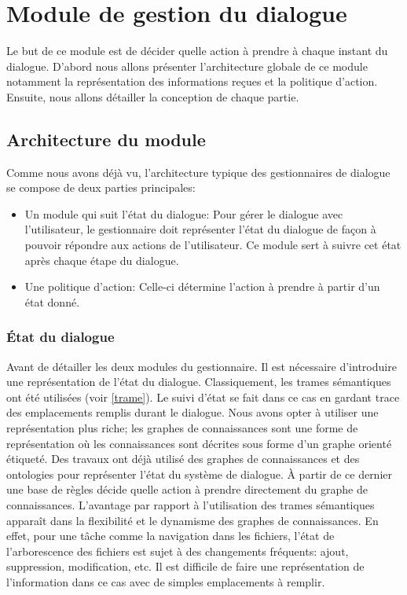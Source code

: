 \section{Module de gestion du dialogue}
Le but de ce module est de décider quelle action à prendre à chaque instant du dialogue. D'abord nous allons présenter l'architecture globale de ce module notamment la représentation des informations reçues et la politique d'action. Ensuite, nous allons détailler la conception de chaque partie.
\subsection{Architecture du module}
Comme nous avons déjà vu, l'architecture typique des gestionnaires de dialogue se compose de deux parties principales: 
\begin{itemize}
	\item Un module qui suit l'état du dialogue: Pour gérer le dialogue avec l'utilisateur, le gestionnaire doit représenter l'état du dialogue de façon à pouvoir répondre aux actions de l'utilisateur. Ce module sert à suivre cet état après chaque étape du dialogue.
	\item Une politique d'action: Celle-ci détermine l'action à prendre à partir d'un état donné.
\end{itemize}
\subsubsection{État du dialogue}
Avant de détailler les deux modules du gestionnaire. Il est nécessaire d'introduire une représentation de l'état du dialogue. Classiquement, les trames sémantiques ont été utilisées (voir \ref{trame}). Le suivi d'état se fait dans ce cas en gardant trace des emplacements remplis durant le dialogue.
Nous avons opter à utiliser une représentation plus riche; les graphes de connaissances sont une forme de représentation où les connaissances sont décrites sous forme d'un graphe orienté étiqueté. Des travaux ont déjà utilisé des graphes de connaissances\cite{Stoyanchev2018} et des ontologies\cite{Wessel2019} pour représenter l'état du système de dialogue. À partir de ce dernier une base de règles décide quelle action à prendre directement du graphe de connaissances. L'avantage par rapport à l'utilisation des trames sémantiques apparaît dans la flexibilité et le dynamisme des graphes de connaissances. En effet, pour une tâche comme la navigation dans les fichiers, l'état de l'arborescence des fichiers est sujet à des changements fréquents: ajout, suppression, modification, etc. Il est difficile de faire une représentation de l'information dans ce cas avec de simples emplacements à remplir.
